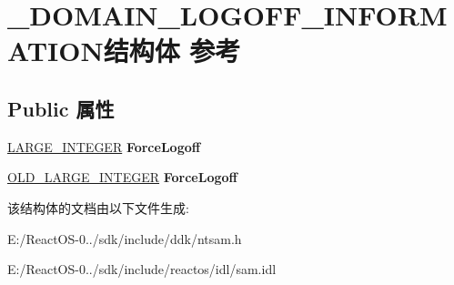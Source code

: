\hypertarget{struct___d_o_m_a_i_n___l_o_g_o_f_f___i_n_f_o_r_m_a_t_i_o_n}{}\section{\+\_\+\+D\+O\+M\+A\+I\+N\+\_\+\+L\+O\+G\+O\+F\+F\+\_\+\+I\+N\+F\+O\+R\+M\+A\+T\+I\+O\+N结构体 参考}
\label{struct___d_o_m_a_i_n___l_o_g_o_f_f___i_n_f_o_r_m_a_t_i_o_n}
\subsection*{Public 属性}
\begin{DoxyCompactItemize}
\item 
\mbox{\label{struct___d_o_m_a_i_n___l_o_g_o_f_f___i_n_f_o_r_m_a_t_i_o_n_a0f8bc10e075c867faa23c85215b29ccf}} 
\hyperlink{union___l_a_r_g_e___i_n_t_e_g_e_r}{L\+A\+R\+G\+E\+\_\+\+I\+N\+T\+E\+G\+ER} {\bfseries Force\+Logoff}
\item 
\mbox{\label{struct___d_o_m_a_i_n___l_o_g_o_f_f___i_n_f_o_r_m_a_t_i_o_n_a23a06bde7cf0b3d7026d50b311271cce}} 
\hyperlink{struct___o_l_d___l_a_r_g_e___i_n_t_e_g_e_r}{O\+L\+D\+\_\+\+L\+A\+R\+G\+E\+\_\+\+I\+N\+T\+E\+G\+ER} {\bfseries Force\+Logoff}
\end{DoxyCompactItemize}


该结构体的文档由以下文件生成\+:\begin{DoxyCompactItemize}
\item 
E\+:/\+React\+O\+S-\/0../sdk/include/ddk/ntsam.\+h\item 
E\+:/\+React\+O\+S-\/0../sdk/include/reactos/idl/sam.\+idl\end{DoxyCompactItemize}
